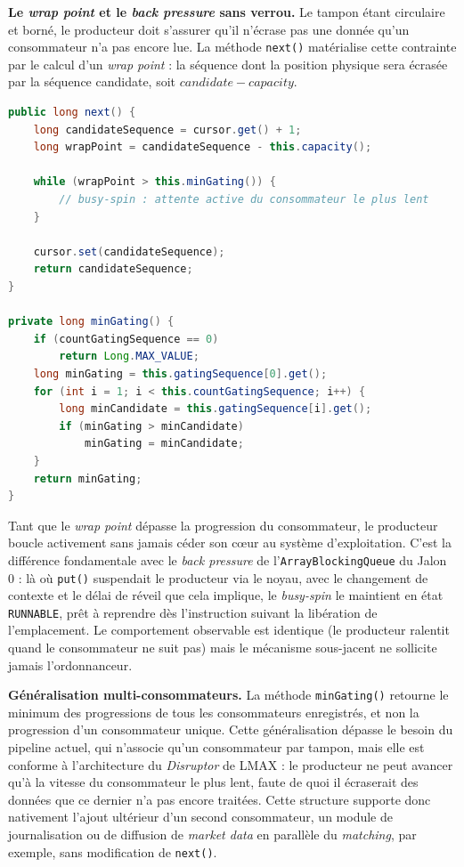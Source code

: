 \textbf{Le \textit{wrap point} et le \textit{back pressure} sans verrou.} Le tampon étant circulaire et borné, le producteur doit s'assurer qu'il n'écrase pas une donnée qu'un consommateur n'a pas encore lue. La méthode \texttt{next()} matérialise cette contrainte par le calcul d'un \textit{wrap point} : la séquence dont la position physique sera écrasée par la séquence candidate, soit $candidate - capacity$.

\begin{lstlisting}[language=Java, caption={Réclamation d'une séquence et contre-pression par busy-spin}]
public long next() {
    long candidateSequence = cursor.get() + 1;
    long wrapPoint = candidateSequence - this.capacity();

    while (wrapPoint > this.minGating()) {
        // busy-spin : attente active du consommateur le plus lent
    }

    cursor.set(candidateSequence);
    return candidateSequence;
}

private long minGating() {
    if (countGatingSequence == 0)
        return Long.MAX_VALUE;
    long minGating = this.gatingSequence[0].get();
    for (int i = 1; i < this.countGatingSequence; i++) {
        long minCandidate = this.gatingSequence[i].get();
        if (minGating > minCandidate)
            minGating = minCandidate;
    }
    return minGating;
}
\end{lstlisting}

Tant que le \textit{wrap point} dépasse la progression du consommateur, le producteur boucle activement sans jamais céder son cœur au système d'exploitation. C'est la différence fondamentale avec le \textit{back pressure} de l'\texttt{ArrayBlockingQueue} du Jalon 0 : là où \texttt{put()} suspendait le producteur via le noyau, avec le changement de contexte et le délai de réveil que cela implique, le \textit{busy-spin} le maintient en état \texttt{RUNNABLE}, prêt à reprendre dès l'instruction suivant la libération de l'emplacement. Le comportement observable est identique (le producteur ralentit quand le consommateur ne suit pas) mais le mécanisme sous-jacent ne sollicite jamais l'ordonnanceur.

\textbf{Généralisation multi-consommateurs.} La méthode \texttt{minGating()} retourne le minimum des progressions de tous les consommateurs enregistrés, et non la progression d'un consommateur unique. Cette généralisation dépasse le besoin du pipeline actuel, qui n'associe qu'un consommateur par tampon, mais elle est conforme à l'architecture du \textit{Disruptor} de LMAX : le producteur ne peut avancer qu'à la vitesse du consommateur le plus lent, faute de quoi il écraserait des données que ce dernier n'a pas encore traitées. Cette structure supporte donc nativement l'ajout ultérieur d'un second consommateur, un module de journalisation ou de diffusion de \textit{market data} en parallèle du \textit{matching}, par exemple, sans modification de \texttt{next()}.

